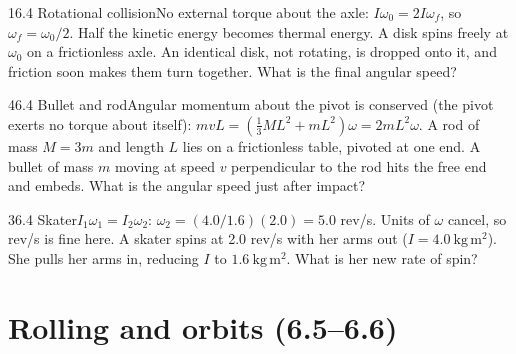 \documentclass[11pt]{article}
\begin{document}
\begin{q}{1}{6.4 Rotational collision}{No external torque about the axle: $I\omega_0 = 2I\omega_f$, so $\omega_f = \omega_0/2$. Half the kinetic energy becomes thermal energy.}
A disk spins freely at $\omega_0$ on a frictionless axle. An identical disk, not rotating, is dropped onto it, and friction soon makes them turn together. What is the final angular speed?
\end{q}
\begin{q}{4}{6.4 Bullet and rod}{Angular momentum about the pivot is conserved (the pivot exerts no torque about itself): $mvL = \left(\tfrac13 ML^2 + mL^2\right)\omega = 2mL^2\omega$.}
A rod of mass $M = 3m$ and length $L$ lies on a frictionless table, pivoted at one end. A bullet of mass $m$ moving at speed $v$ perpendicular to the rod hits the free end and embeds. What is the angular speed just after impact?
\end{q}
\begin{q}{3}{6.4 Skater}{$I_1\omega_1 = I_2\omega_2$: $\omega_2 = (4.0/1.6)(2.0) = 5.0$ rev/s. Units of $\omega$ cancel, so rev/s is fine here.}
A skater spins at 2.0 rev/s with her arms out ($I = 4.0\ \mathrm{kg\,m^2}$). She pulls her arms in, reducing $I$ to $1.6\ \mathrm{kg\,m^2}$. What is her new rate of spin?
\end{q}

\section{Rolling and orbits (6.5--6.6)}
\end{document}
